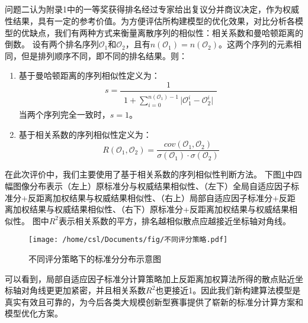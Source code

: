 \documentclass[bwprint]{gmcmthesis}
\begin{document}
\subsection{}
\par
问题二认为附录1中的一等奖获得排名经过专家给出复议分并商议决定，作为权威性结果，具有一定的参考价值。为方便评估所构建模型的优化效果，对比分析各模型的优缺点，我们有两种方式来衡量离散序列的相似性：相关系数和曼哈顿距离的倒数。
设有两个排名序列$\mathcal{O}_1$和$\mathcal{O}_2$，且有$n(\mathcal{O}_1)=n(\mathcal{O}_2)$。这两个序列的元素相同，但是排列顺序不同，即不同的排名结果。则：
\begin{enumerate}
	\item 基于曼哈顿距离的序列相似性定义为：
	\begin{equation}
	s=\frac{1}{
		\begin{aligned}
		1+\sum_{i=0}^{n(\mathcal{O}_1)-1}\vert\mathcal{O}_1^i-\mathcal{O}_2^i\vert
		\end{aligned}
	}
	\end{equation}
	当两个序列完全一致时，$s=1$。
	
	\item 基于相关系数的序列相似性定义为：
	\begin{equation}
	R\left(\mathcal{O}_1,\mathcal{O}_2 \right)=\frac{cov\left(\mathcal{O}_1,\mathcal{O}_2 \right) }{
		\sigma\left(\mathcal{O}_1\right) \cdot\sigma\left(\mathcal{O}_2 \right) 	
	}
	\end{equation}
\end{enumerate}

	在此次评价中，我们主要使用了基于相关系数的序列相似性判断方法。
	下图\ref{fig:不同评分策略下的标准分分布示意图}中四幅图像分布表示（左上）原标准分与权威结果相似性、（左下）全局自适应因子标准分+反距离加权结果与权威结果相似性、（右上）局部自适应因子标准分+反距离加权结果与权威结果相似性、（右下）原标准分+反距离加权结果与权威结果相似性。
  图中$R^2$表示相关系数的平方，排名越相似散点应越接近坐标轴对角线。
\begin{figure}[h]
	\centering
	\texttt{[image: /home/csl/Documents/fig/不同评分策略.pdf]}
	\caption{\normf 不同评分策略下的标准分分布示意图}
	\label{fig:不同评分策略下的标准分分布示意图}
\end{figure}

可以看到，局部自适应因子标准分计算策略加上反距离加权算法所得的散点贴近坐标轴对角线更更加紧密，并且相关系数$R^2$也更接近1。因此我们新构建算法模型是真实有效且可靠的，为今后各类大规模创新型赛事提供了崭新的标准分计算方案和模型优化方案。
\end{document}
